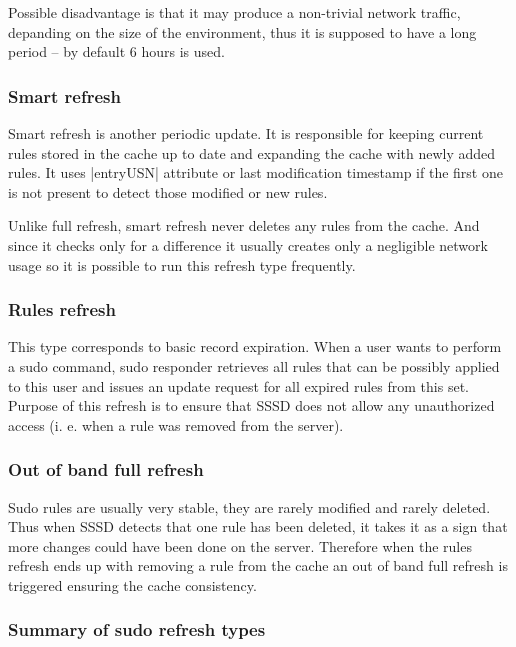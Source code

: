 Possible disadvantage is that it may produce a non-trivial network traffic,
depanding on the size of the environment, thus it is supposed to have a long
period -- by default 6 hours is used.

\subsubsection{Smart refresh}
\label{sssd:cache:sudo:smart}

Smart refresh is another periodic update. It is responsible for keeping current
rules stored in the cache up to date and expanding the cache with newly added
rules. It uses |entryUSN| attribute or last modification timestamp if the first
one is not present to detect those modified or new rules.

Unlike full refresh, smart refresh never deletes any rules from the cache. And
since it checks only for a difference it usually creates only a negligible 
network usage so it is possible to run this refresh type frequently. 

\subsubsection{Rules refresh}
\label{sssd:cache:sudo:rules}

This type corresponds to basic record expiration. When a user wants to perform a
sudo command, sudo responder retrieves all rules that can be possibly applied to
this user and issues an update request for all expired rules from this set.
Purpose of this refresh is to ensure that SSSD does not allow any unauthorized
access (i. e. when a rule was removed from the server).

\subsubsection{Out of band full refresh}
\label{sssd:cache:sudo:oob}

Sudo rules are usually very stable, they are rarely modified and rarely deleted.
Thus when SSSD detects that one rule has been deleted, it takes it as a sign
that more changes could have been done on the server. Therefore when the rules
refresh ends up with removing a rule from the cache an out of band full refresh
is triggered ensuring the cache consistency.

\subsubsection{Summary of sudo refresh types}
\label{sssd:cache:sudo:summary}

